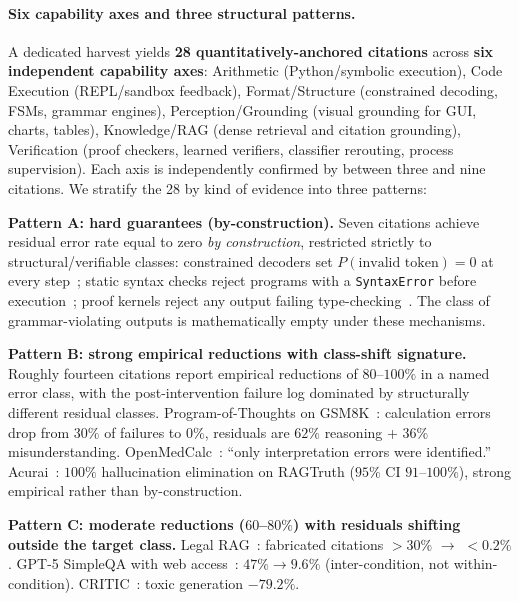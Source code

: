 \documentclass{article}
\theoremstyle{taeplain}
\theoremstyle{taedefn}
\newcommand{\teArrow}{\ensuremath{\rightarrow}}
\begin{document}
\paragraph{Six capability axes and three structural patterns.}
A dedicated harvest yields \textbf{28 quantitatively-anchored citations} across \textbf{six independent capability axes}: Arithmetic (Python/symbolic execution), Code Execution (REPL/sandbox feedback), Format/Structure (constrained decoding, FSMs, grammar engines), Perception/Grounding (visual grounding for GUI, charts, tables), Knowledge/RAG (dense retrieval and citation grounding), Verification (proof checkers, learned verifiers, classifier rerouting, process supervision). Each axis is independently confirmed by between three and nine citations. We stratify the 28 by kind of evidence into three patterns:

\textbf{Pattern A: hard guarantees (by-construction).} Seven citations achieve residual error rate equal to zero \emph{by construction}, restricted strictly to structural/verifiable classes: constrained decoders set $P(\text{invalid token}) = 0$ at every step~\citep{suresh2025dingo,zhang2023tooldec,dong2024xgrammar,dong2026xgrammar2,openai2024structured}; static syntax checks reject programs with a \texttt{SyntaxError} before execution~\citep{wen2024fixing}; proof kernels reject any output failing type-checking~\citep{ren2025deepseekprover}. The class of grammar-violating outputs is mathematically empty under these mechanisms.

\textbf{Pattern B: strong empirical reductions with class-shift signature.} Roughly fourteen citations report empirical reductions of $80$--$100\%$ in a named error class, with the post-intervention failure log dominated by structurally different residual classes. Program-of-Thoughts on GSM8K~\citep{chen2022pot}: calculation errors drop from $30\%$ of failures to $0\%$, residuals are $62\%$ reasoning + $36\%$ misunderstanding. OpenMedCalc~\citep{goodell2025clinical}: ``only interpretation errors were identified.'' Acurai~\citep{wood2024acurai}: $100\%$ hallucination elimination on RAGTruth ($95\%$ CI $91$--$100\%$), strong empirical rather than by-construction.

\textbf{Pattern C: moderate reductions ($60$--$80\%$) with residuals shifting outside the target class.} Legal RAG~\citep{dantart2026fabrication}: fabricated citations $>30\%$ $\teArrow$ $<0.2\%$. GPT-5 SimpleQA with web access~\citep{openai2025gpt5}: $47\% \teArrow 9.6\%$ (inter-condition, not within-condition). CRITIC~\citep{gou2024critic}: toxic generation $-79.2\%$.
\end{document}
